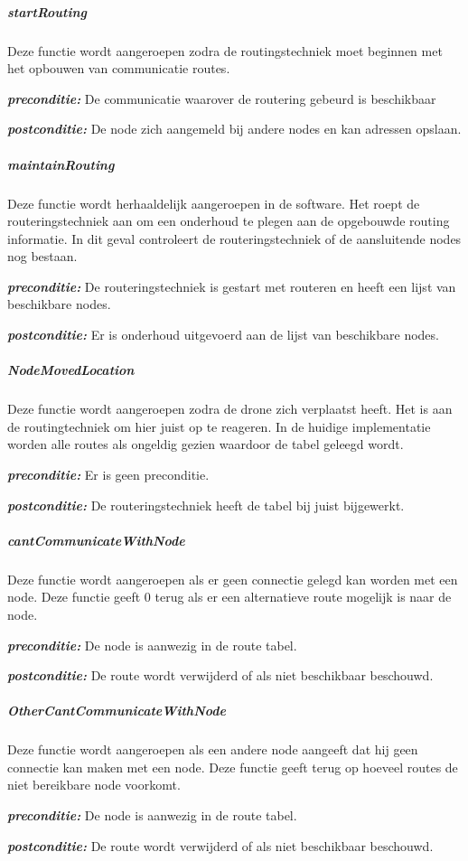\documentclass[a4paper, 11pt, oneside]{report}
\begin{document}
\subparagraph{startRouting}
Deze functie wordt aangeroepen zodra de routingstechniek moet beginnen met het opbouwen van communicatie routes.

\textbf{\textit{preconditie:}} De communicatie waarover de routering gebeurd is beschikbaar

\textbf{\textit{postconditie:}} De node zich aangemeld bij andere nodes en kan adressen opslaan.

\subparagraph{maintainRouting}
Deze functie wordt herhaaldelijk aangeroepen in de software.
Het roept de routeringstechniek aan om een onderhoud te plegen aan de opgebouwde routing informatie.
In dit geval controleert de routeringstechniek of de aansluitende nodes nog bestaan.

\textbf{\textit{preconditie:}} De routeringstechniek is gestart met routeren en heeft een lijst van beschikbare nodes.

\textbf{\textit{postconditie:}} Er is onderhoud uitgevoerd aan de lijst van beschikbare nodes.

\subparagraph{NodeMovedLocation} 
Deze functie wordt aangeroepen zodra de drone zich verplaatst heeft. Het is aan de routingtechniek om hier juist op te reageren.
In de huidige implementatie worden alle routes als ongeldig gezien waardoor de tabel geleegd wordt. 

\textbf{\textit{preconditie:}} Er is geen preconditie.

\textbf{\textit{postconditie:}} De routeringstechniek heeft de tabel bij juist bijgewerkt.


\subparagraph{cantCommunicateWithNode} 
Deze functie wordt aangeroepen als er geen connectie gelegd kan worden met een node. Deze functie geeft 0 terug als er een alternatieve route mogelijk is naar de node. 

\textbf{\textit{preconditie:}} De node is aanwezig in de route tabel.

\textbf{\textit{postconditie:}} De route wordt verwijderd of als niet beschikbaar beschouwd.


\subparagraph{OtherCantCommunicateWithNode}
Deze functie wordt aangeroepen als een andere node aangeeft dat hij geen connectie kan maken met een node. Deze functie geeft terug op hoeveel routes de niet bereikbare node voorkomt. 

\textbf{\textit{preconditie:}} De node is aanwezig in de route tabel.

\textbf{\textit{postconditie:}} De route wordt verwijderd of als niet beschikbaar beschouwd.
\end{document}
